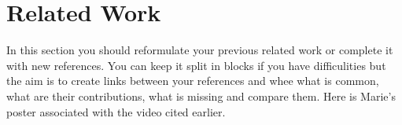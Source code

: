 \section{Related Work}
In this section you should reformulate your previous related work or complete it with new references. You can keep it split in blocks if you have difficulities but the aim is to create links between your references and whee what is common, what are their contributions, what is missing and compare them. Here is Marie's poster \cite{muehlhaus2022feather} associated with the video cited earlier. 
